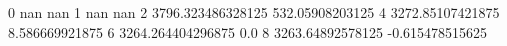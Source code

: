 0 nan nan
1 nan nan
2 3796.323486328125 532.05908203125
4 3272.85107421875 8.586669921875
6 3264.264404296875 0.0
8 3263.64892578125 -0.615478515625
